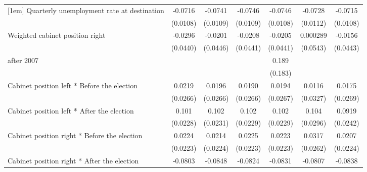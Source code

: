 \begin{table}[htbp]
\begin{tabular}{l*{6}{c}}
[1em]
Quarterly unemployment rate at destination&     -0.0716\sym{***}&     -0.0741\sym{***}&     -0.0746\sym{***}&     -0.0746\sym{***}&     -0.0728\sym{***}&     -0.0715\sym{***}\\
                    &    (0.0108)         &    (0.0109)         &    (0.0109)         &    (0.0108)         &    (0.0112)         &    (0.0108)         \\
[1em]
Weighted cabinet position right&     -0.0296         &     -0.0201         &     -0.0208         &     -0.0205         &    0.000289         &     -0.0156         \\
                    &    (0.0440)         &    (0.0446)         &    (0.0441)         &    (0.0441)         &    (0.0543)         &    (0.0443)         \\
[1em]
after 2007          &                     &                     &                     &       0.189         &                     &                     \\
                    &                     &                     &                     &     (0.183)         &                     &                     \\
[1em]
Cabinet position left * Before the election&      0.0219         &      0.0196         &      0.0190         &      0.0194         &      0.0116         &      0.0175         \\
                    &    (0.0266)         &    (0.0266)         &    (0.0266)         &    (0.0267)         &    (0.0327)         &    (0.0269)         \\
[1em]
Cabinet position left * After the election&       0.101\sym{***}&       0.102\sym{***}&       0.102\sym{***}&       0.102\sym{***}&       0.104\sym{***}&      0.0919\sym{***}\\
                    &    (0.0228)         &    (0.0231)         &    (0.0229)         &    (0.0229)         &    (0.0296)         &    (0.0242)         \\
[1em]
Cabinet position right * Before the election&      0.0224         &      0.0214         &      0.0225         &      0.0223         &      0.0317         &      0.0207         \\
                    &    (0.0223)         &    (0.0224)         &    (0.0223)         &    (0.0223)         &    (0.0262)         &    (0.0224)         \\
[1em]
Cabinet position right * After the election&     -0.0803\sym{**} &     -0.0848\sym{**} &     -0.0824\sym{**} &     -0.0831\sym{**} &     -0.0807\sym{**} &     -0.0838\sym{**} \\

\end{tabular}
\end{table}
